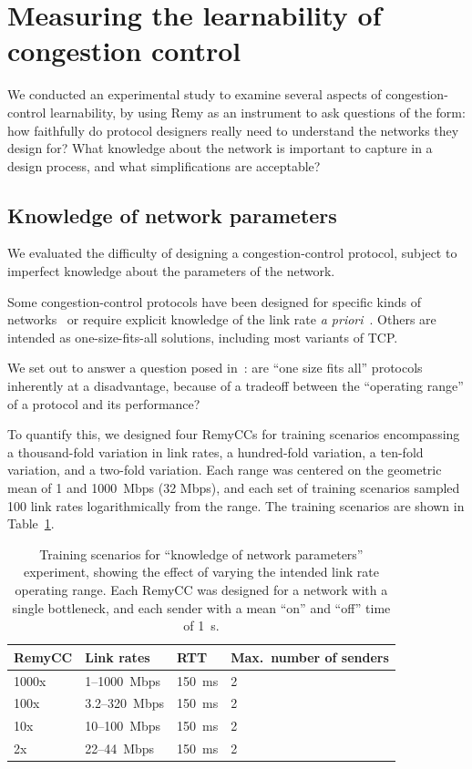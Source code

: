 \section{Measuring the learnability of congestion control}
\label{s:operational}

We conducted an experimental study to examine several aspects of
congestion-control learnability, by using Remy as an instrument to ask
questions of the form: how faithfully do protocol designers really
need to understand the networks they design for? What knowledge about
the network is important to capture in a design process, and what
simplifications are acceptable?

\subsection{Knowledge of network parameters}

\label{s:oprangeperftradeoff}

We evaluated the difficulty of designing a congestion-control
protocol, subject to imperfect knowledge about the parameters of the
network.

Some congestion-control protocols have been designed for specific
kinds of networks~\cite{dctcp,westwood} or require explicit knowledge
of the link rate \emph{a priori}~\cite{xcp}. Others are intended as
one-size-fits-all solutions, including most variants of TCP.

We set out to answer a question posed in~\cite{wroclawski}: are ``one
size fits all'' protocols inherently at a disadvantage, because of a
tradeoff between the ``operating range'' of a protocol and its performance?

To quantify this, we designed four RemyCCs for training
scenarios encompassing a thousand-fold variation in link rates, a
hundred-fold variation, a ten-fold variation, and a two-fold
variation. Each range was centered on the geometric mean of 1 and
1000~Mbps (32 Mbps), and each set of training scenarios sampled 100
link rates logarithmically from the range. The training scenarios are
shown in Table~\ref{table:oprange}.

\begin{table}
\caption{Training scenarios for ``knowledge of network parameters''
  experiment, showing the effect of varying the intended link rate
  operating range. Each RemyCC was designed for a network with a single
  bottleneck, and each sender with a mean ``on'' and ``off'' time of
  1~s.}
\label{table:oprange}
\begin{center}
\begin{tabular}{l|l|l|l}
\bf RemyCC & \bf Link rates & \bf RTT & \bf Max.~number of senders \\
\hline
1000x  & 1--1000~Mbps & 150~ms & 2 \\
100x   & 3.2--320~Mbps & 150~ms & 2 \\
10x    & 10--100~Mbps & 150~ms & 2 \\
2x     & 22--44~Mbps & 150~ms & 2 \\
\end{tabular}
\end{center}
\end{table}

